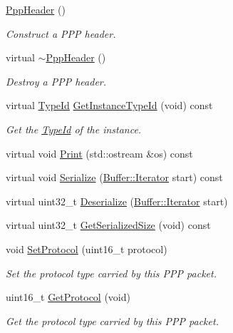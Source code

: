 \begin{DoxyCompactItemize}
\item 
\hyperlink{classns3_1_1PppHeader_ae75ebcd92f5f19e6211489fffa2834be}{Ppp\+Header} ()
\begin{DoxyCompactList}\small\item\em Construct a P\+PP header. \end{DoxyCompactList}\item 
virtual \hyperlink{classns3_1_1PppHeader_ab1a0401bc3ccda1669b8709a854d8e73}{$\sim$\+Ppp\+Header} ()
\begin{DoxyCompactList}\small\item\em Destroy a P\+PP header. \end{DoxyCompactList}\item 
virtual \hyperlink{classns3_1_1TypeId}{Type\+Id} \hyperlink{classns3_1_1PppHeader_aeb3082cf924a1ec4d0e6e21d39469a18}{Get\+Instance\+Type\+Id} (void) const 
\begin{DoxyCompactList}\small\item\em Get the \hyperlink{classns3_1_1TypeId}{Type\+Id} of the instance. \end{DoxyCompactList}\item 
virtual void \hyperlink{classns3_1_1PppHeader_a294af9ecf627de349d1fd14d758f7efa}{Print} (std\+::ostream \&os) const 
\item 
virtual void \hyperlink{classns3_1_1PppHeader_afb1858c81a6644b5a99f0153e10155fc}{Serialize} (\hyperlink{classns3_1_1Buffer_1_1Iterator}{Buffer\+::\+Iterator} start) const 
\item 
virtual uint32\+\_\+t \hyperlink{classns3_1_1PppHeader_af092f637bd2ffb1f1b0481f6f2b8f793}{Deserialize} (\hyperlink{classns3_1_1Buffer_1_1Iterator}{Buffer\+::\+Iterator} start)
\item 
virtual uint32\+\_\+t \hyperlink{classns3_1_1PppHeader_a87c59c8e4926f5dfa6e3f8baa23f0218}{Get\+Serialized\+Size} (void) const 
\item 
void \hyperlink{classns3_1_1PppHeader_a3490d0fa6baca9b89f9e61cd8d0ed115}{Set\+Protocol} (uint16\+\_\+t protocol)
\begin{DoxyCompactList}\small\item\em Set the protocol type carried by this P\+PP packet. \end{DoxyCompactList}\item 
uint16\+\_\+t \hyperlink{classns3_1_1PppHeader_aa5cfc64ff43c2b6b4a5cc671e9340059}{Get\+Protocol} (void)
\begin{DoxyCompactList}\small\item\em Get the protocol type carried by this P\+PP packet. \end{DoxyCompactList}\end{DoxyCompactItemize}
